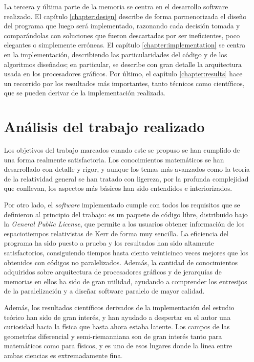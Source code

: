 La tercera y última parte de la memoria se centra en el desarrollo software realizado. El capítulo \ref{chapter:design} describe de forma pormenorizada el diseño del programa que luego será implementado, razonando cada decisión tomada y comparándolas con soluciones que fueron descartadas por ser ineficientes, poco elegantes o simplemente erróneas. El capítulo \ref{chapter:implementation} se centra en la implementación, describiendo las particularidades del código y de los algoritmos diseñados; en particular, se describe con gran detalle la arquitectura usada en los procesadores gráficos. Por último, el capítulo \ref{chapter:results} hace un recorrido por los resultados más importantes, tanto técnicos como científicos, que se pueden derivar de la implementación realizada.

\section*{Análisis del trabajo realizado}

Los objetivos del trabajo marcados cuando este se propuso se han cumplido de una forma realmente satisfactoria. Los conocimientos matemáticos se han desarrollado con detalle y rigor, y aunque los temas más avanzados como la teoría de la relatividad general se han tratado con ligereza, por la profunda complejidad que conllevan, los aspectos más básicos han sido entendidos e interiorizados.

Por otro lado, el \emph{software} implementado cumple con todos los requisitos que se definieron al principio del trabajo: es un paquete de código libre, distribuido bajo la \emph{General Public License}, que permite a los usuarios obtener información de los espaciotiempos relativistas de Kerr de forma muy sencilla. La eficiencia del programa ha sido puesto a prueba y los resultados han sido altamente satisfactorios, consiguiendo tiempos hasta ciento veinticinco veces mejores que los obtenidos con códigos no paralelizados. Además, la cantidad de conocimientos adquiridos sobre arquitectura de procesadores gráficos y de jerarquías de memorias en ellos ha sido de gran utilidad, ayudando a comprender los entresijos de la paralelización y a diseñar software paralelo de mayor calidad.

Además, los resultados científicos derivados de la implementación del estudio teórico han sido de gran interés, y han ayudado a despertar en el autor una curiosidad hacia la física que hasta ahora estaba latente. Los campos de las geometrías diferencial y semi-riemanniana son de gran interés tanto para matemáticos como para físicos, y es uno de esos lugares donde la línea entre ambas ciencias es extremadamente fina.

